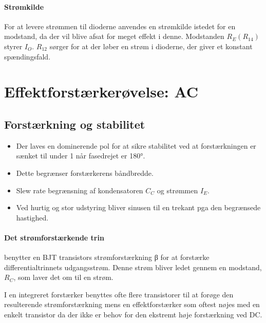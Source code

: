 \documentclass[danish]{article}
\begin{document}
\paragraph{Strømkilde}
For at levere strømmen til dioderne anvendes en strømkilde istedet for en modstand, da der vil blive afsat for meget effekt i denne.
Modstanden $R_E (R_{14})$ styrer $I_O$.
$R_{12}$ sørger for at der løber en strøm i dioderne, der giver et konstant spændingsfald.

\newpage
\section{Effektforstærkerøvelse: AC}

\subsection{Forstærkning og stabilitet}
\begin{itemize}
	\item Der laves en dominerende pol for at sikre stabilitet ved at forstærkningen er sænket til under 1 når fasedrejet er 180°.
	\item Dette begrænser forstærkerens båndbredde.
	\item Slew rate begrænsning af kondensatoren $C_C$ og strømmen $I_E$.
	\item Ved hurtig og stor udstyring bliver sinusen til en trekant pga den begrænsede hastighed.
\end{itemize}

\paragraph{Det strømforstærkende trin} benytter en BJT transistors strømforstærkning β for at forstærke differentialtrinnets udgangsstrøm. Denne strøm bliver ledet gennem en modstand, $R_C$, som laver det om til en strøm. 

I en integreret forstærker benyttes ofte flere transistorer til at forøge den resulterende strømforstærkning mens en effektforstærker som oftest nøjes med en enkelt transistor da der ikke er behov for den ekstremt høje forstærkning ved DC. 
\end{document}

